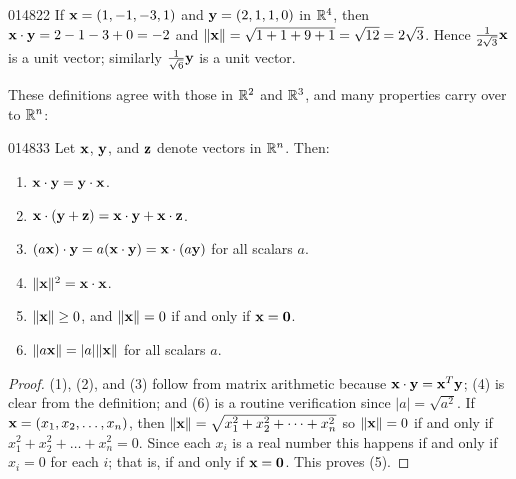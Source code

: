 \begin{example}{}{014822}
If $\textbf{x} = (1, -1, -3, 1)$ and $\textbf{y} = (2, 1, 1, 0)$ in $\mathbb{R}^4$, then $\textbf{x} \cdot \textbf{y} = 2 - 1 - 3 + 0 = -2$ and $\|\textbf{x}\| = \sqrt{1 + 1 + 9 + 1} = \sqrt{12} = 2\sqrt{3}$. Hence $\tfrac{1}{2\sqrt{3}}\textbf{x}$ is a unit vector; similarly $\tfrac{1}{\sqrt{6}}\textbf{y}$ is a unit vector.
\end{example}

\noindent These definitions agree with those in $\mathbb{R}^2$ and $\mathbb{R}^3$, and many properties carry over to $\mathbb{R}^n$:

\begin{theorem}{}{014833} %
Let $\textbf{x}$, $\textbf{y}$, and $\textbf{z}$ denote vectors in $\mathbb{R}^n$. Then:

\begin{enumerate}
\item $\textbf{x} \cdot \textbf{y} = \textbf{y} \cdot \textbf{x}$.

\item $\textbf{x} \cdot (\textbf{y} + \textbf{z}) = \textbf{x} \cdot \textbf{y} + \textbf{x} \cdot \textbf{z}$.

\item $(a\textbf{x}) \cdot \textbf{y} = a(\textbf{x} \cdot \textbf{y}) = \textbf{x} \cdot (a\textbf{y})$ for all scalars $a$.

\item $\|\textbf{x}\|^{2} = \textbf{x} \cdot \textbf{x}$.

\item $\|\textbf{x}\| \geq 0$, and $\|\textbf{x}\| = 0$ if and only if $\textbf{x} = \textbf{0}$.

\item $\| a \textbf{x}\| = | a | \|\textbf{x}\|$ for all scalars $a$.

\end{enumerate}
\end{theorem}

\begin{proof}
(1), (2), and (3) follow from matrix arithmetic because $\textbf{x} \cdot \textbf{y} = \textbf{x}^{T}\textbf{y}$; (4) is clear from the definition; and (6) is a routine verification since $|a| = \sqrt{a^2}$. If $\textbf{x} = (x_{1}, x_{2}, \dots, x_{n})$, then $\|\textbf{x}\| = \sqrt{x_1^2 + x_2^2 + \dots + x_n^2}$ so $\|\textbf{x}\| = 0$ if and only if $ x_1^2 + x_2^2 + \dots + x_n^2 = 0$. Since each $x_{i}$ is a real number this happens if and only if $x_{i} = 0$ for each $i$; that is, if and only if $\textbf{x} = \textbf{0}$. This proves (5).
\end{proof}


